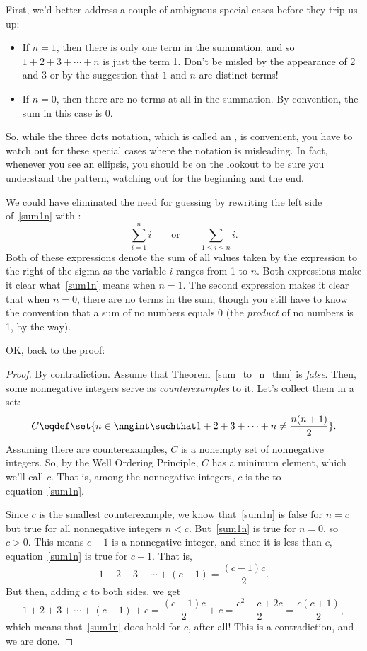 First, we'd better address a couple of ambiguous special
cases before they trip us up:
\begin{itemize}
\item If $n = 1$, then there is only one term in the summation, and so $1
  + 2 + 3 + \cdots + n$ is just the term 1.  Don't be misled by the
  appearance of 2 and 3 or by the suggestion that $1$ and $n$ are distinct
  terms!
\item If $n = 0$, then there are no terms at all in the summation.  By
convention, the sum in this case is 0.
\end{itemize}
So, while the three dots notation, which is called an ,
is convenient, you have to watch out for these special cases where the
notation is misleading.  In fact, whenever you see an ellipsis, you
should be on the lookout to be sure you understand the pattern,
watching out for the beginning and the end.

We could have eliminated the need for guessing by rewriting the left side
of~\eqref{sum1n} with :
\[
\sum_{i=1}^n i
\qquad \text{or} \qquad
\sum_{1 \leq i \leq n} i.
\]
Both of these expressions denote the sum of all values taken by the
expression to the right of the sigma as the variable $i$ ranges from
1 to $n$.  Both expressions make it clear what~\eqref{sum1n} means
when $n=1$.  The second expression makes it clear that when $n=0$,
there are no terms in the sum, though you still have to know the
convention that a sum of no numbers equals 0 (the \emph{product} of no
numbers is 1, by the way).

OK, back to the proof:
\begin{proof}
By contradiction.  Assume that Theorem~\ref{sum_to_n_thm} is
\emph{false}.  Then, some nonnegative integers serve as
\emph{counterexamples} to it. Let's collect them in a set:
\[
C \eqdef \set{n\in\nngint \suchthat 
        1 + 2 + 3 + \cdots + n \neq \frac{n(n+1)}{2}}.
\]
Assuming there are counterexamples, $C$ is a nonempty set of
nonnegative integers.  So, by the Well Ordering Principle, $C$ has a
minimum element, which we'll call $c$.  That is, among the nonnegative
integers, $c$ is the \emph{} to
equation~\eqref{sum1n}.

Since $c$ is the smallest counterexample, we know that~\eqref{sum1n} is
false for $n=c$ but true for all nonnegative integers $n<c$.
But~\eqref{sum1n} is true for $n=0$, so $c > 0$.  This means $c-1$ is a
nonnegative integer, and since it is less than $c$, equation~\eqref{sum1n}
is true for $c-1$.  That is,
\[
        1 + 2 + 3 + \cdots + (c-1) = \frac{(c-1)c}{2}.
\]
But then, adding $c$ to both sides, we get
\[
1 + 2 + 3 + \cdots + (c-1) + c 
        = \frac{(c-1)c}{2} + c
        = \frac{c^2 - c + 2c}{2} 
        = \frac{c(c+1)}{2},
\]
which means that~\eqref{sum1n} does hold for $c$, after all!  This is a
contradiction, and we are done.
\end{proof}


